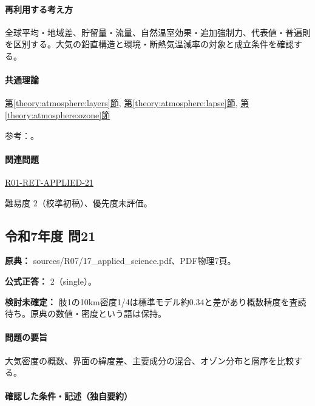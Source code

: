 \paragraph{再利用する考え方} 全球平均・地域差、貯留量・流量、自然温室効果・追加強制力、代表値・普遍則を区別する。大気の鉛直構造と環境・断熱気温減率の対象と成立条件を確認する。

\paragraph{共通理論} \hyperref[theory:atmosphere:layers]{第\ref*{theory:atmosphere:layers}節}, \hyperref[theory:atmosphere:lapse]{第\ref*{theory:atmosphere:lapse}節}, \hyperref[theory:atmosphere:ozone]{第\ref*{theory:atmosphere:ozone}節}

\par 参考：\cite{atm_noaa_layers,atm_us1976,atm_jma_ozone}。

\paragraph{関連問題} \hyperref[q:r01-ret-applied-21]{R01-RET-APPLIED-21}

\par 難易度 2（校準初稿）、優先度未評価。

\subsection{令和7年度 問21}
\label{q:r07-reg-applied-21}

\noindent\textbf{原典：} sources/R07/17\_applied\_science.pdf、PDF物理7頁。

\textbf{公式正答：} 2（single）。

\par\textbf{検討未確定：} 肢1の10km密度1/4は標準モデル約0.34と差があり概数精度を査読待ち。原典の数値・密度という語は保持。

\paragraph{問題の要旨} 大気密度の概数、界面の緯度差、主要成分の混合、オゾン分布と層序を比較する。

\paragraph{確認した条件・記述（独自要約）}\mbox{}\par

